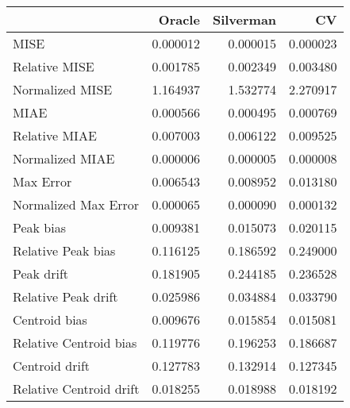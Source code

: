 \begin{tabular}{lrrr}
  \hline
 & Oracle & Silverman & CV \\ 
  \hline
MISE & 0.000012 & 0.000015 & 0.000023 \\ 
  Relative MISE & 0.001785 & 0.002349 & 0.003480 \\ 
  Normalized MISE & 1.164937 & 1.532774 & 2.270917 \\ 
  MIAE & 0.000566 & 0.000495 & 0.000769 \\ 
  Relative MIAE & 0.007003 & 0.006122 & 0.009525 \\ 
  Normalized MIAE & 0.000006 & 0.000005 & 0.000008 \\ 
  Max Error & 0.006543 & 0.008952 & 0.013180 \\ 
  Normalized Max Error & 0.000065 & 0.000090 & 0.000132 \\ 
  Peak bias & 0.009381 & 0.015073 & 0.020115 \\ 
  Relative Peak bias & 0.116125 & 0.186592 & 0.249000 \\ 
  Peak drift & 0.181905 & 0.244185 & 0.236528 \\ 
  Relative Peak drift & 0.025986 & 0.034884 & 0.033790 \\ 
  Centroid bias & 0.009676 & 0.015854 & 0.015081 \\ 
  Relative Centroid bias & 0.119776 & 0.196253 & 0.186687 \\ 
  Centroid drift & 0.127783 & 0.132914 & 0.127345 \\ 
  Relative Centroid drift & 0.018255 & 0.018988 & 0.018192 \\ 
   \hline
\end{tabular}

